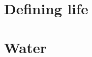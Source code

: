 \documentclass[DIV=calc, paper=a4, fontsize=12pt]{scrartcl}	 %
\begin{document}

\section{Defining life}

\begin{multicols}{2}





\end{multicols} \noindent\makebox[\linewidth]{\rule{\paperwidth}{0.4pt}}


\section{Water}

\begin{multicols}{2}



\end{multicols} \noindent\makebox[\linewidth]{\rule{\paperwidth}{0.4pt}}
\end{document}

